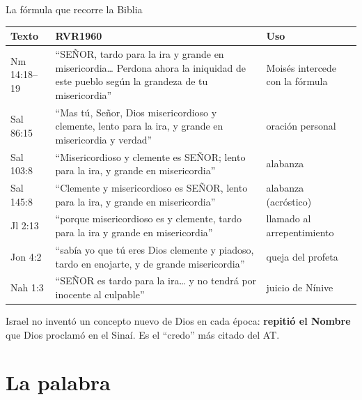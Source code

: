 \documentclass[hyperref={bookmarks=false},aspectratio=169]{beamer}
\newcommand{\SENOR}{S{\fontsize{0.78em}{1em}\selectfont EÑOR}}
\newcommand{\destacar}[1]{\textbf{\textcolor{azul}{#1}}}
\begin{document}
\begin{frame}{La fórmula que recorre la Biblia}
\scriptsize\renewcommand{\arraystretch}{1.18}
\begin{tabular}{@{}>{\RaggedRight\arraybackslash}p{1.9cm}>{\RaggedRight\arraybackslash}p{6.4cm}>{\RaggedRight\arraybackslash}p{3.5cm}@{}}
\toprule
\textbf{Texto} & \textbf{RVR1960} & \textbf{Uso} \\ \midrule
Nm 14:18--19 & ``\SENOR, tardo para la ira y grande en misericordia\ldots{} Perdona ahora la iniquidad de este pueblo según la grandeza de tu misericordia'' & Moisés intercede con la fórmula \\
Sal 86:15 & ``Mas tú, Señor, Dios misericordioso y clemente, lento para la ira, y grande en misericordia y verdad'' & oración personal \\
Sal 103:8 & ``Misericordioso y clemente es \SENOR; lento para la ira, y grande en misericordia'' & alabanza \\
Sal 145:8 & ``Clemente y misericordioso es \SENOR, lento para la ira, y grande en misericordia'' & alabanza (acróstico) \\
Jl 2:13 & ``porque misericordioso es y clemente, tardo para la ira y grande en misericordia'' & llamado al arrepentimiento \\
Jon 4:2 & ``sabía yo que tú eres Dios clemente y piadoso, tardo en enojarte, y de grande misericordia'' & queja del profeta \\
Nah 1:3 & ``\SENOR{} es tardo para la ira\ldots{} y no tendrá por inocente al culpable'' & juicio de Nínive \\
\bottomrule
\end{tabular}\par\medskip
\small\RaggedRight Israel no inventó un concepto nuevo de Dios en cada época: \destacar{repitió el Nombre} que Dios proclamó en el Sinaí. Es el ``credo'' más citado del AT.
\end{frame}

\section{La palabra}
\end{document}
